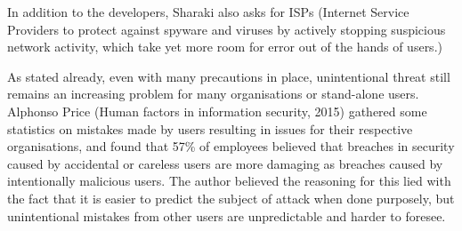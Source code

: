 \documentclass[journal,comsoc]{IEEEtran}
\begin{document}
In addition to the developers, Sharaki also asks for ISPs (Internet Service Providers to protect against spyware and viruses by actively stopping suspicious network activity, which take yet more room for error out of the hands of users.) \par
As stated already, even with many precautions in place, unintentional threat still remains an increasing problem for many organisations or stand-alone users. Alphonso Price (Human factors in information security, 2015) \cite{human-factors} gathered some statistics on mistakes made by users resulting in issues for their respective organisations, and found that 57\% of employees believed that breaches in security caused by accidental or careless users are more damaging as breaches caused by intentionally malicious users. The author believed the reasoning for this lied with the fact that it is easier to predict the subject of attack when done purposely, but unintentional mistakes from other users are unpredictable and harder to foresee. \par
\end{document}
